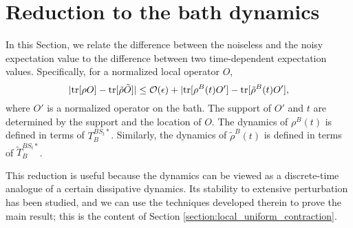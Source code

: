 \documentclass[prx,aps,amsmath,amssymb,floatfix,superscriptaddress,11pt,tightenlines,longbibliography,onecolumn,notitlepage]{revtex4-1}
\newcommand{\Tr}{\textnormal{tr}}
\begin{document}
\section{Reduction to the bath dynamics \label{section:Heisenberg}}
In this Section, we relate the difference between the noiseless and the noisy expectation value to the difference between two time-dependent expectation values. Specifically, for a normalized local operator $O$,
\begin{equation}
  |\Tr[ \rho O ] - \Tr[\tilde{\rho} \tilde{O}] |\leq \mathcal{O}(\epsilon) +  |\Tr[\rho^B(t) O'] - \Tr[\tilde{\rho}^B(t) O'],
\end{equation}
where $O'$ is a normalized operator on the bath. The support of $O'$ and $t$ are determined by the support and the location of $O$. The dynamics of $\rho^B(t)$ is defined in terms of $T_B^{BS_t*}$. Similarly, the dynamics of  $\tilde{\rho}^B(t)$ is defined in terms of  $\tilde{T}_B^{BS_t*}$. 

This reduction is useful because the dynamics can be viewed as a discrete-time analogue of a certain dissipative dynamics. Its stability to extensive perturbation has been studied\cite{Cubitt2013,Lucia2014}, and we can use the techniques developed therein to prove the main result; this is the content of Section \ref{section:local_uniform_contraction}.
\end{document}
